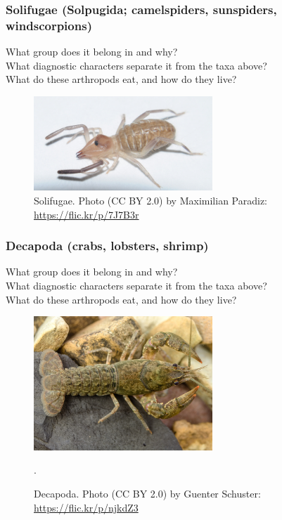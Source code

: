 \documentclass[letterpaper, 11pt]{article}
\begin{document}
\subsubsection*{Solifugae (Solpugida; camelspiders, sunspiders, windscorpions)}
What group does it belong in and why?\\

\noindent{}What diagnostic characters separate it from the taxa above?\\

\noindent{}What do these arthropods eat, and how do they live?\\

\begin{figure}[ht!]
  \centering
    \includegraphics[width=0.6\textwidth]{solfugida}
  \caption{Solifugae. Photo (CC BY 2.0) by Maximilian Paradiz: \url{https://flic.kr/p/7J7B3r}}
  \label{fig:solfugida}
\end{figure}

\subsubsection*{Decapoda (crabs, lobsters, shrimp)}
What group does it belong in and why?\\

\noindent{}What diagnostic characters separate it from the taxa above?\\

\noindent{}What do these arthropods eat, and how do they live?\\

\begin{figure}[ht!]
  \centering
    \includegraphics[width=0.6\textwidth]{decapod}
  \caption{Decapoda. Photo (CC BY 2.0) by Guenter Schuster: \url{https://flic.kr/p/njkdZ3}}.
  \label{fig:decapoda}
\end{figure}
\end{document}
